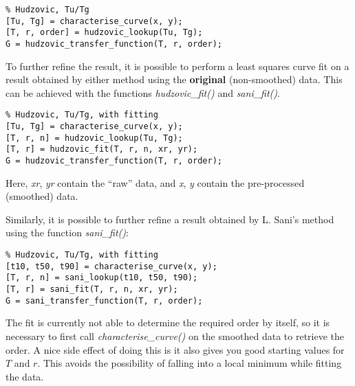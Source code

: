 \begin{lstlisting}
% Hudzovic, Tu/Tg
[Tu, Tg] = characterise_curve(x, y);
[T, r, order] = hudzovic_lookup(Tu, Tg);
G = hudzovic_transfer_function(T, r, order);
\end{lstlisting}

To  further  refine  the result, it is possible to perform a least squares curve
fit  on  a  result  obtained  by  either  method  using   the  \textbf{original}
(non-smoothed)   data.    This    can    be    achieved   with   the   functions
\textit{hudzovic\_fit()} and \textit{sani\_fit()}.

\begin{lstlisting}
% Hudzovic, Tu/Tg, with fitting
[Tu, Tg] = characterise_curve(x, y);
[T, r, n] = hudzovic_lookup(Tu, Tg);
[T, r] = hudzovic_fit(T, r, n, xr, yr);
G = hudzovic_transfer_function(T, r, order);
\end{lstlisting}

Here,  \textit{xr},  \textit{yr}  contain  the  ``raw''  data,  and  \textit{x},
\textit{y} contain the pre-processed (smoothed) data.

Similarly, it is  possible  to  further  refine  a  result obtained by L. Sani's
method using the function \textit{sani\_fit()}:

\begin{lstlisting}
% Hudzovic, Tu/Tg, with fitting
[t10, t50, t90] = characterise_curve(x, y);
[T, r, n] = sani_lookup(t10, t50, t90);
[T, r] = sani_fit(T, r, n, xr, yr);
G = sani_transfer_function(T, r, order);
\end{lstlisting}

The fit is currently not  able  to determine the required order by itself, so it
is necessary to first call \textit{characterise\_curve()} on  the  smoothed data
to retrieve the order. A nice  side  effect  of  doing this is it also gives you
good starting values for $T$ and $r$. This  avoids  the  possibility  of falling
into a local minimum while fitting the data.



